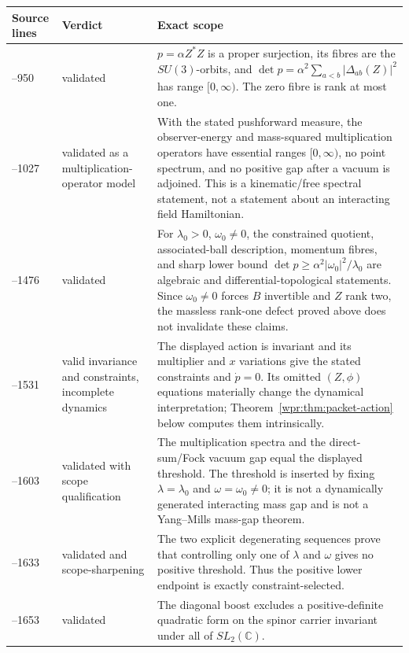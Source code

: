 \begin{center}
\begin{tabular}{>{\raggedright\arraybackslash}p{}
                >{\raggedright\arraybackslash}p{}
                >{\raggedright\arraybackslash}p{}}
\toprule
Source lines&Verdict&Exact scope\\
\midrule
875--950&validated&
\(p=\alpha Z^*Z\) is a proper surjection, its fibres are the
\(SU(3)\)-orbits, and
\(\det p=\alpha^2\sum_{a<b}|\Delta_{ab}(Z)|^2\) has range
\([0,\infty)\).  The zero fibre is rank at most one.\\
\addlinespace
952--1027&validated as a multiplication-operator model&
With the stated pushforward measure, the observer-energy and
mass-squared multiplication operators have essential ranges
\([0,\infty)\), no point spectrum, and no positive gap after a vacuum
is adjoined.  This is a kinematic/free spectral statement, not a
statement about an interacting field Hamiltonian.\\
\addlinespace
1029--1476&validated&
For \(\lambda_0>0\), \(\omega_0\neq0\), the constrained quotient,
associated-ball description, momentum fibres, and sharp lower bound
\(\det p\geq\alpha^2|\omega_0|^2/\lambda_0\) are algebraic and
differential-topological statements.  Since \(\omega_0\neq0\) forces
\(B\) invertible and \(Z\) rank two, the massless rank-one defect
proved above does not invalidate these claims.\\
\addlinespace
1482--1531&valid invariance and constraints, incomplete dynamics&
The displayed action is invariant and its multiplier and \(x\)
variations give the stated constraints and \(\dot p=0\).  Its omitted
\((Z,\phi)\) equations materially change the dynamical interpretation;
Theorem~\ref{wpr:thm:packet-action} below computes them intrinsically.\\
\addlinespace
1533--1603&validated with scope qualification&
The multiplication spectra and the direct-sum/Fock vacuum gap equal
the displayed threshold.  The threshold is inserted by fixing
\(\lambda=\lambda_0\) and \(\omega=\omega_0\neq0\); it is not a
dynamically generated interacting mass gap and is not a Yang--Mills
mass-gap theorem.\\
\addlinespace
1605--1633&validated and scope-sharpening&
The two explicit degenerating sequences prove that controlling only
one of \(\lambda\) and \(\omega\) gives no positive threshold.  Thus
the positive lower endpoint is exactly constraint-selected.\\
\addlinespace
1635--1653&validated&
The diagonal boost excludes a positive-definite quadratic form on the
spinor carrier invariant under all of \(SL_2(\mathbb C)\).\\
\bottomrule
\end{tabular}
\end{center}

